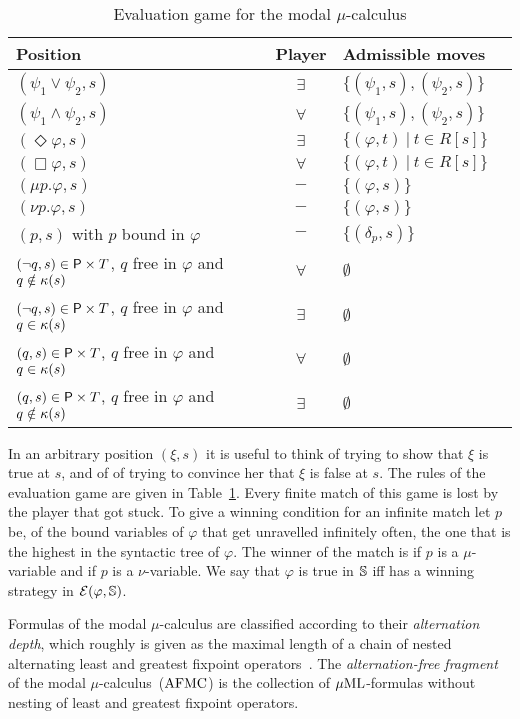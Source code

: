 \begin{table}
\centering
\begin{tabular}{|l|c|l|c|}
  \hline
  Position & Player & Admissible moves\\
  \hline
  $(\psi_1 \vee \psi_2,s)$ & $\exists$ & $\{(\psi_1,s),(\psi_2,s) \}$ \\
  $(\psi_1 \wedge \psi_2,s)$ & $\forall$ & $\{(\psi_1,s),(\psi_2,s) \}$ \\
  $(\Diamond\varphi,s)$ & $\exists$ & $\{(\varphi,t)\ |\ t \in R[s] \}$ \\
  $(\Box\varphi,s)$ & $\forall$ & $\{(\varphi,t)\ |\ t \in R[s] \}$ \\
  $(\mu p.\varphi,s)$ & $-$ & $\{(\varphi,s) \}$ \\
  $(\nu p.\varphi,s)$ & $-$ & $\{(\varphi,s) \}$ \\
  $(p,s)$ with $p$ bound in $\varphi$ & $-$ & $\{(\delta_p,s) \}$ \\
  $(\lnot q,s) \in \mathsf{P} \times T$, $q$ free in $\varphi$ and $q \notin \kappa(s)$ & $\forall$ & $\emptyset$\\
  $(\lnot q,s) \in \mathsf{P} \times T$, $q$ free in $\varphi$ and $q \in \kappa(s)$ & $\exists$ & $\emptyset$\\
  $(q,s) \in \mathsf{P} \times T$, $q$ free in $\varphi$ and $q \in \kappa(s)$ & $\forall$ & $\emptyset$\\
  $(q,s) \in \mathsf{P} \times T$, $q$ free in $\varphi$ and $q \notin \kappa(s)$ & $\exists$ & $\emptyset$\\
  \hline
\end{tabular}
\caption{Evaluation game for the modal $\mu$-calculus}
\label{egame_mucalc}
\end{table}
%

In an arbitrary position $(\xi,s)$ it is useful to think of
\eloise trying to show that $\xi$ is true at $s$, and of \abelard of trying to convince her that $\xi$ is false at $s$. The rules of the evaluation game are given in Table~\ref{egame_mucalc}.
Every finite match of this game is lost by the player that got stuck. To give a winning condition for an infinite match let $p$ be, of the bound variables of $\varphi$ that get unravelled infinitely often, the one that is the highest in the syntactic tree of $\varphi$. The winner of the match is \abelard if $p$ is a $\mu$-variable and \eloise if $p$ is a $\nu$-variable. We say that $\varphi$ is true in $\mathbb{S}$ iff \eloise has a winning strategy in $\mathcal{E}(\varphi,\mathbb{S})$.

\bigskip
Formulas of the modal $\mu$-calculus are classified according to their
\emph{alternation depth}, which roughly is given as the maximal length of
a chain of nested alternating least and greatest fixpoint operators~\cite{Niwinski86}.
The \emph{alternation-free fragment} of the modal $\mu$-calculus~($\mathrm{AFMC}$) is the collection of
$\mu\mathrm{ML}$-formulas without nesting of least and greatest fixpoint operators.


